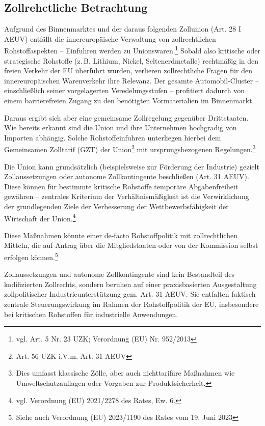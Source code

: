 \documentclass[12pt,a4paper,oneside]{book} %
\begin{document}
{\subsection{Zollrehctliche Betrachtung}
Aufgrund des Binnenmarktes und der daraus folgenden Zollunion (Art. 28 I AEUV) entfällt die innereuropäische Verwaltung von zollrechtlichen Rohstoffaspekten -- Einfuhren werden zu \glqq Unionswaren\grqq.\footnote{vgl. Art. 5 Nr. 23 UZK; Verordnung (EU) Nr. 952/2013} Sobald also kritische oder strategische Rohstoffe (z. B. Lithium, Nickel, Seltenerdmetalle) rechtmäßig in den freien Verkehr der EU überführt wurden, verlieren zollrechtliche Fragen für den innereuropäischen Warenverkehr ihre Relevanz. Der gesamte Automobil-Cluster – einschließlich seiner vorgelagerten Veredelungsstufen – profitiert dadurch von einem barrierefreien Zugang zu den benötigten Vormaterialien im Binnenmarkt.

Daraus ergibt sich aber eine gemeinsame Zollregelung gegenüber Drittstaaten. Wie bereits erkannt sind die Union und ihre Unternehmen hochgradig von Importen abhängig. Solche Rohstoffeinfuhren unterliegen hierbei dem Gemeinsamen Zolltarif (GZT) der Union\footnote{Art. 56 UZK i.V.m. Art. 31 AEUV} mit ursprungsbezogenen Regelungen.\footnote{Dies umfasst klassische Zölle, aber auch nichttarifäre Maßnahmen wie Umweltschutzauflagen oder Vorgaben zur Produktsicherheit.}

Die Union kann grundsätzlich (beispielsweise zur Förderung der Industrie) gezielt Zollaussetzungen oder autonome Zollkontingente beschließen (Art. 31 AEUV). Diese können für bestimmte kritische Rohstoffe temporäre Abgabenfreiheit gewähren -- zentrales Kriterium der Verhältnismäßigkeit ist die Verwirklichung der grundlegenden Ziele der Verbesserung der Wettbewerbsfähigkeit der Wirtschaft der Union.\footnote{vgl. Verordnung (EU) 2021/2278 des Rates, Ew. 6.}

Diese Maßnahmen könnte einer de-facto Rohstoffpolitik mit zollrechtlichen Mitteln, die auf Antrag über die Mitgliedstaaten oder von der Kommission selbst erfolgen können.\footnote{Siehe auch Verordnung (EU) 2023/1190 des Rates vom 19. Juni 2023}

Zollaussetzungen und autonome Zollkontingente sind kein Bestandteil des kodifizierten Zollrechts, sondern beruhen auf einer praxisbasierten Ausgestaltung zollpolitischer Industrieunterstützung gem. Art. 31 AEUV. Sie entfalten faktisch zentrale Steuerungswirkung im Rahmen der Rohstoffpolitik der EU, insbesondere bei kritischen Rohstoffen für industrielle Anwendungen.

}
\end{document}
